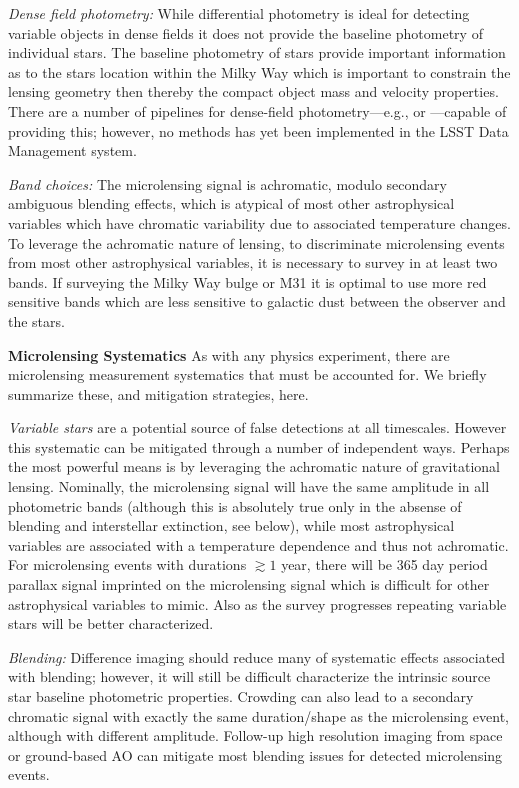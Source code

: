 \emph{Dense field photometry:} While differential photometry is ideal for detecting variable objects in dense fields it does not provide the baseline photometry of individual stars. The baseline photometry of stars provide important information as to the stars location within the Milky Way which is important to constrain the lensing geometry then thereby the compact object mass and velocity properties. There are a number of pipelines for dense-field photometry---e.g.,  \citep{1987PASP...99..191S} or  \citep{1710.01309}---capable of providing this; however, no methods has yet been implemented in the LSST Data Management system.

\emph{Band choices:}
The microlensing signal is achromatic, modulo secondary ambiguous blending effects, which is atypical of most other astrophysical variables which have chromatic variability due to associated temperature changes.
To leverage the achromatic nature of lensing, to discriminate microlensing events from most other astrophysical variables, it is necessary to survey in at least two bands.
If surveying the Milky Way bulge or M31 it is optimal to use more red sensitive bands which are less sensitive to galactic dust between the observer and the stars.

\noindent \textbf{Microlensing Systematics}
As with any physics experiment, there are microlensing measurement systematics that must be accounted for.
We briefly summarize these, and mitigation strategies, here.

\emph{Variable stars} are a potential source of false detections at all timescales.
However this systematic can be mitigated through a number of independent ways.
Perhaps the most powerful means is by leveraging the achromatic nature of gravitational lensing.
Nominally, the microlensing signal will have the same amplitude in all photometric bands (although this is absolutely true only in the absense of blending and interstellar extinction, see below), while most astrophysical variables are associated with a temperature dependence and thus not achromatic.
For microlensing events with durations $\gtrsim 1$ year, there will be 365 day period parallax signal imprinted on the microlensing signal which is difficult for other astrophysical variables to mimic.
Also as the survey progresses repeating variable stars will be better characterized.

\emph{Blending:} Difference imaging should reduce many of systematic effects associated with blending; however, it will still be difficult characterize the intrinsic source star baseline photometric properties. Crowding can also lead to a secondary chromatic signal with exactly the same duration/shape as the microlensing event, although with different amplitude. Follow-up high resolution imaging from space or ground-based AO can mitigate most blending issues for detected microlensing events.

